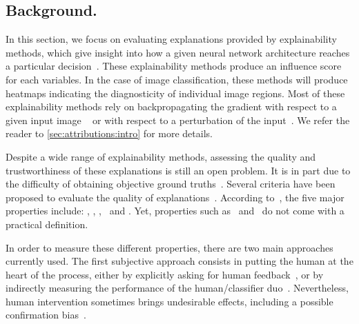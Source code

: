 \subsection{Background.} 

In this section, we focus on evaluating explanations provided by explainability methods, which give insight into how a given neural network architecture reaches a particular decision~\cite{doshivelez2017rigorous}. These explainability methods produce an influence score for each variables. In the case of image classification, these methods will produce heatmaps indicating the diagnosticity of individual image regions. Most of these explainability methods rely on backpropagating the gradient with respect to a given input image ~\cite{Zeiler2011, simonyan2013deep, bach2015pixel, Fong_2017, shrikumar2017learning, sundararajan2017axiomatic, smilkov2017smoothgrad, Selvaraju_2019, hartley2021swag} or with respect to a perturbation of the input~\cite{zeiler2013visualizing, zhou2014object, ribeiro2016lime, li2016understanding, zintgraf2017visualizing, ribeiro2018anchors}. We refer the reader to \autoref{sec:attributions:intro} for more details.

Despite a wide range of explainability methods, assessing the quality and trustworthiness of these explanations is still an open problem. It is in part due to the difficulty of obtaining objective ground truths~\cite{samek2015evaluating,linsley2018learning}. Several criteria have been proposed to evaluate the quality of explanations~\cite{tintarev2007survey, miller2017explanation,robnik2018perturbation,gilpin2018explaining,alvarezmelis2018robust, survey2019metrics,ferrettini2021coalitional}. According to~\cite{survey2019metrics}, the five major properties include: \fidelity, \stability, \comprehensibility, \representativity~and \consistency. Yet, properties such as \representativity~and \consistency~do not come with a practical definition.

In order to measure these different properties, there are two main approaches currently used. The first subjective approach consists in putting the human at the heart of the process, either by explicitly asking for human feedback~\cite{Selvaraju_2019, ribeiro2016lime, lundberg2017unified}, or by indirectly measuring the performance of the human/classifier duo~\cite{lage2019evaluation, narayanan2018humans, schmidt2019quantifying}. Nevertheless, human intervention sometimes brings undesirable effects, including a possible confirmation bias~\cite{adebayo2018sanity}.

